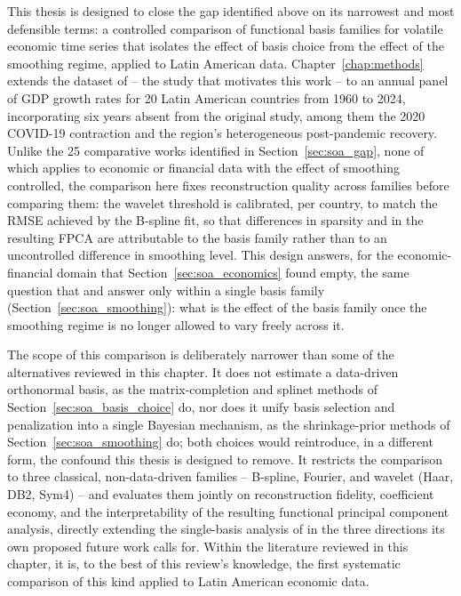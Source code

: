 This thesis is designed to close the gap identified above on its
narrowest and most defensible terms: a controlled comparison of
functional basis families for volatile economic time series that
isolates the effect of basis choice from the effect of the smoothing
regime, applied to Latin American data. Chapter~\ref{chap:methods}
extends the dataset of \cite{padilla2020} -- the study that motivates
this work -- to an annual panel of GDP growth rates for 20 Latin
American countries from 1960 to 2024, incorporating six years absent
from the original study, among them the 2020 COVID-19 contraction and
the region's heterogeneous post-pandemic recovery. Unlike the 25
comparative works identified in Section~\ref{sec:soa_gap}, none of which
applies to economic or financial data with the effect of smoothing
controlled, the comparison here fixes reconstruction quality across
families before comparing them: the wavelet threshold is calibrated, per
country, to match the RMSE achieved by the B-spline fit, so that
differences in sparsity and in the resulting FPCA are attributable to
the basis family rather than to an uncontrolled difference in smoothing
level. This design answers, for the economic-financial domain that
Section~\ref{sec:soa_economics} found empty, the same question that
\cite{aguilera_comparative_2013} and \cite{gao_factor_2024} answer only
within a single basis family (Section~\ref{sec:soa_smoothing}): what is
the effect of the basis family once the smoothing regime is no longer
allowed to vary freely across it.

The scope of this comparison is deliberately narrower than some of the
alternatives reviewed in this chapter. It does not estimate a
data-driven orthonormal basis, as the matrix-completion and splinet
methods of Section~\ref{sec:soa_basis_choice} do, nor does it unify
basis selection and penalization into a single Bayesian mechanism, as
the shrinkage-prior methods of Section~\ref{sec:soa_smoothing} do; both
choices would reintroduce, in a different form, the confound this thesis
is designed to remove. It restricts the comparison to three classical,
non-data-driven families -- B-spline, Fourier, and wavelet (Haar, DB2,
Sym4) -- and evaluates them jointly on reconstruction fidelity,
coefficient economy, and the interpretability of the resulting
functional principal component analysis, directly extending the
single-basis analysis of \cite{padilla2020} in the three directions its
own proposed future work calls for. Within the literature reviewed in
this chapter, it is, to the best of this review's knowledge, the first
systematic comparison of this kind applied to Latin American economic
data.
